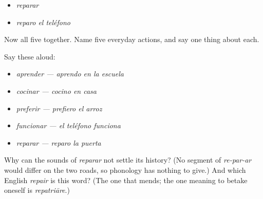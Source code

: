 \begin{itemize}
\raggedright
  \item \emph{reparar}
  \item \emph{reparo el teléfono}
\end{itemize}

Now all five together. Name five everyday actions, and say one thing about each.

Say these aloud:

\begin{itemize}
\raggedright
  \item \emph{aprender — aprendo en la escuela}
  \item \emph{cocinar — cocino en casa}
  \item \emph{preferir — prefiero el arroz}
  \item \emph{funcionar — el teléfono funciona}
  \item \emph{reparar — reparo la puerta}
\end{itemize}

\begin{tcolorbox}[breakable,colback=teal!4,colframe=teal!35!black,title={Before you move on}]
Why can the sounds of \emph{reparar} not settle its history? (No segment of \emph{re-par-ar} would differ on the two roads, so phonology has nothing to give.) And which English \emph{repair} is this word? (The one that mends; the one meaning to betake oneself is \emph{repatriāre}.)
\end{tcolorbox}
